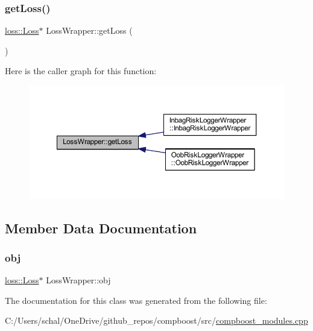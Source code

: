 \subsubsection{\texorpdfstring{get\+Loss()}{getLoss()}}
{\footnotesize\ttfamily \mbox{\hyperlink{classloss_1_1_loss}{loss\+::\+Loss}}$\ast$ Loss\+Wrapper\+::get\+Loss (\begin{DoxyParamCaption}{ }\end{DoxyParamCaption})\hspace{0.3cm}{\ttfamily [inline]}}

Here is the caller graph for this function\+:\nopagebreak
\begin{figure}[H]
\begin{center}
\leavevmode
\includegraphics[width=350pt]{class_loss_wrapper_a7b1abc6f1d1fd9c2fbc439ee32a0f844_icgraph}
\end{center}
\end{figure}


\subsection{Member Data Documentation}
\mbox{\label{class_loss_wrapper_a2902226f55d916ef64fdd4da3179630a}} 
\subsubsection{\texorpdfstring{obj}{obj}}
{\footnotesize\ttfamily \mbox{\hyperlink{classloss_1_1_loss}{loss\+::\+Loss}}$\ast$ Loss\+Wrapper\+::obj\hspace{0.3cm}{\ttfamily [protected]}}



The documentation for this class was generated from the following file\+:\begin{DoxyCompactItemize}
\item 
C\+:/\+Users/schal/\+One\+Drive/github\+\_\+repos/compboost/src/\mbox{\hyperlink{compboost__modules_8cpp}{compboost\+\_\+modules.\+cpp}}\end{DoxyCompactItemize}
